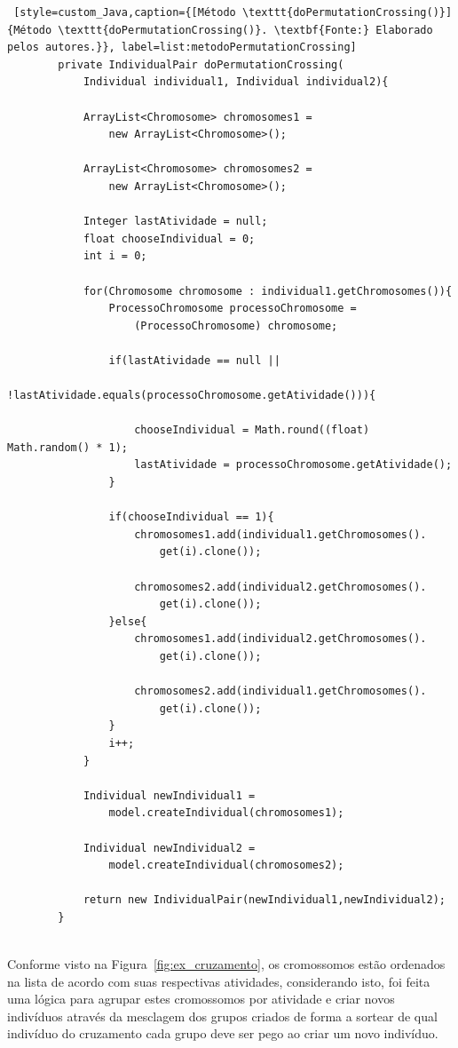 \begin{lstlisting} [style=custom_Java,caption={[Método \texttt{doPermutationCrossing()}]{Método \texttt{doPermutationCrossing()}. \textbf{Fonte:} Elaborado pelos autores.}}, label=list:metodoPermutationCrossing] 
		private IndividualPair doPermutationCrossing(
			Individual individual1, Individual individual2){
			
			ArrayList<Chromosome> chromosomes1 = 
				new ArrayList<Chromosome>();
				
			ArrayList<Chromosome> chromosomes2 = 
				new ArrayList<Chromosome>();
				
			Integer lastAtividade = null;
			float chooseIndividual = 0;
			int i = 0;
			
			for(Chromosome chromosome : individual1.getChromosomes()){
				ProcessoChromosome processoChromosome = 
					(ProcessoChromosome) chromosome;
				
				if(lastAtividade == null || 
					!lastAtividade.equals(processoChromosome.getAtividade())){
					
					chooseIndividual = Math.round((float) Math.random() * 1);
					lastAtividade = processoChromosome.getAtividade();
				}
				
				if(chooseIndividual == 1){
					chromosomes1.add(individual1.getChromosomes().
						get(i).clone());
						
					chromosomes2.add(individual2.getChromosomes().
						get(i).clone());
				}else{
					chromosomes1.add(individual2.getChromosomes().
						get(i).clone());
						
					chromosomes2.add(individual1.getChromosomes().
						get(i).clone());
				}
				i++;
			}
			
			Individual newIndividual1 = 
				model.createIndividual(chromosomes1);
				
			Individual newIndividual2 = 
				model.createIndividual(chromosomes2);
			
			return new IndividualPair(newIndividual1,newIndividual2);
		}
	

\end{lstlisting}

\par Conforme visto na Figura~\ref{fig:ex_cruzamento}, os cromossomos estão ordenados na lista de acordo com suas respectivas atividades, considerando isto, foi feita uma lógica para agrupar estes cromossomos por atividade e criar novos indivíduos através da mesclagem dos grupos criados de forma a sortear de qual indivíduo do cruzamento cada grupo deve ser pego ao criar um novo indivíduo. 

